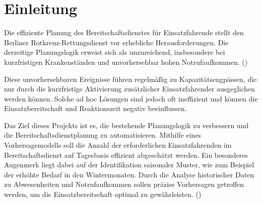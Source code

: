 \documentclass[%
pdftex,
oneside,			%
11pt,				%
parskip=half,		%
headheight = 12pt,	%
headsepline,		%
footsepline,		%
footheight = 16pt,	%
abstracton,		%
DIV=calc,		%
BCOR=8mm,		%
headinclude=false,	%
footinclude=false,	%
listof=totoc,		%
toc=bibliography,	%
]{scrreprt}	%
\begin{document}
\begin{spacing}{1.1}
    \begingroup
    
        \renewcommand*{\chapterpagestyle}{empty}
        \pagestyle{empty}

        \setcounter{tocdepth}{3}
        
        \tableofcontents
        \clearpage
    \endgroup
\end{spacing}
\newpage

\cleardoublepage 
\listoffigures
\clearpage

\lstlistoflistings %
\clearpage

\cleardoublepage
\listoftables
\clearpage

\chapter{Einleitung}


    Die effiziente Planung des Bereitschaftsdienstes für Einsatzfahrende stellt den Berliner Rotkreuz-Rettungsdienst vor erhebliche Herausforderungen. 
    Die derzeitige Planungslogik erweist sich als unzureichend, insbesondere bei kurzfristigen Krankenständen und unvorhersehbar hohen Notrufaufkommen. 
    (\cite[Vgl.][S. 3, 4]{data_science_aufgabenstellung})

    Diese unvorhersehbaren Ereignisse führen regelmäßig zu Kapazitätsengpässen, die nur durch die kurzfristige Aktivierung zusätzlicher Einsatzfahrender ausgeglichen werden können. 
    Solche ad hoc Lösungen sind jedoch oft ineffizient und können die Einsatzbereitschaft und Reaktionszeit negativ beeinflussen.

    Das Ziel dieses Projekts ist es, die bestehende Planungslogik zu verbessern und die Bereitschaftsdienstplanung zu automatisieren. 
    Mithilfe eines Vorhersagemodells soll die Anzahl der erforderlichen Einsatzfahrenden im Bereitschaftsdienst auf Tagesbasis effizient abgeschätzt werden.
    Ein besonderes Augenmerk liegt dabei auf der Identifikation saisonaler Muster, wie zum Beispiel der erhöhte Bedarf in den Wintermonaten. 
    Durch die Analyse historischer Daten zu Abwesenheiten und Notrufaufkommen sollen präzise Vorhersagen getroffen werden, um die Einsatzbereitschaft optimal zu gewährleisten.
    (\cite[Vgl.][S. 3, 4]{data_science_aufgabenstellung})
    
\end{document}

